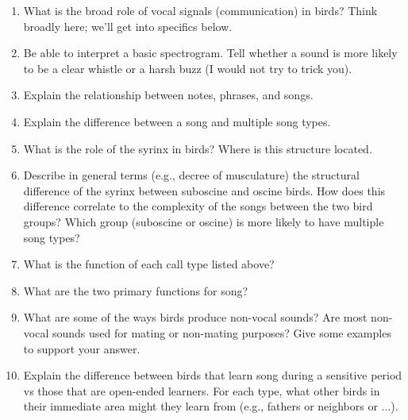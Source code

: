 \documentclass[nofonts, letterpaper]{tufte-handout}
\begin{document}
\begin{enumerate}

\item What is the broad role of vocal signals (communication) in birds? Think broadly here; we'll get into specifics below.

\item Be able to interpret a basic spectrogram. Tell whether a sound is more likely to be a clear whistle or a harsh buzz (I would not try to trick you).

\item Explain the relationship between notes, phrases, and songs.

\item Explain the difference between a song and multiple song types.

\item What is the role of the syrinx in birds? Where is this structure located.

\item Describe in general terms (e.g., decree of musculature) the structural difference of the syrinx between suboscine and oscine birds. How does this difference correlate to the complexity of the songs between the two bird groups? Which group (suboscine or oscine) is more likely to have multiple song types?

\item What is the function of each call type listed above?

\item What are the two primary functions for song?

\item What are some of the ways birds produce non-vocal sounds? Are most non-vocal sounds used for mating or non-mating purposes? Give some examples to support your answer.

\item Explain the difference between birds that learn song during a sensitive period vs those that are open-ended learners. For each type, what other birds in their immediate area might they learn from (e.g., fathers or neighbors or $\dots$).

\end{enumerate}
\end{document}
